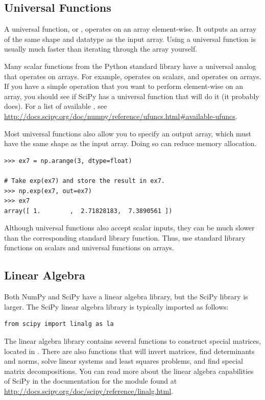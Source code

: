 \subsection*{Universal Functions}

A universal function, or , operates on an array element-wise. 
It outputs an array of the same shape and datatype as the input array. 
Using a universal function is usually much faster than iterating through the array yourself.

Many scalar functions from the Python standard library have a universal analog that operates on arrays. 
For example,  operates on scalars, and  operates on arrays. 
If you have a simple operation that you want to perform element-wise on an array, you should see if SciPy has a universal function that will do it (it probably does). 
For a list of available , see \url{http://docs.scipy.org/doc/numpy/reference/ufuncs.html#available-ufuncs}.

Most universal functions also allow you to specify an output array, which must have the same shape as the input array.
Doing so can reduce memory allocation. 

\begin{lstlisting}
>>> ex7 = np.arange(3, dtype=float)

# Take exp(ex7) and store the result in ex7.
>>> np.exp(ex7, out=ex7) 
>>> ex7
array([ 1.        ,  2.71828183,  7.3890561 ])
\end{lstlisting}

Although universal functions also accept scalar inputs, they can be much slower than the corresponding standard library function. 
Thus, use standard library functions on scalars and universal functions on arrays.

\subsection*{Linear Algebra}
Both NumPy and SciPy have a linear algebra library, but the SciPy library is larger. The SciPy linear algebra library is typically imported as follows:

\begin{lstlisting}
from scipy import linalg as la
\end{lstlisting}

The linear algebra library contains several functions to construct special 
matrices, located in 
. There are also functions that will invert matrices, find determinants and norms, solve linear systems and least squares problems, and find special matrix decompositions. You can read more about the linear algebra capabilities of SciPy in the 
documentation for the  module found at
\url{http://docs.scipy.org/doc/scipy/reference/linalg.html}.

